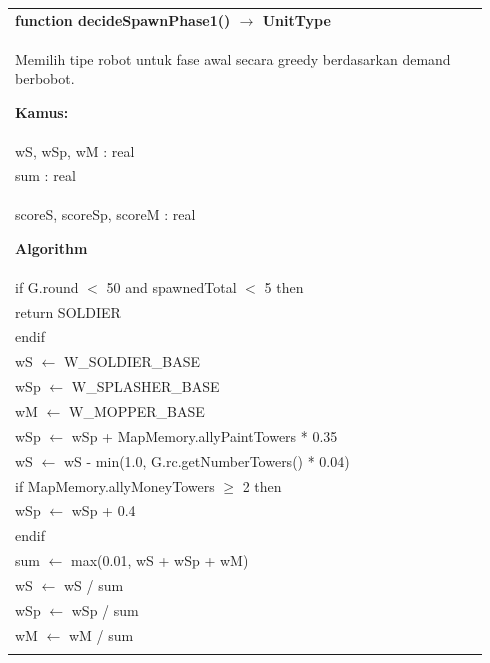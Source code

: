 \documentclass{article}
\newenvironment{pseudobox}
{
\centering
\begin{longtable}{|p{0.94\linewidth}|}
\hline
}
{
\\ \hline
\end{longtable}
\vspace{0.05cm}
}
\begin{document}
\begin{pseudobox}
\textbf{function decideSpawnPhase1() $\rightarrow$ UnitType} \\
{ Memilih tipe robot untuk fase awal secara greedy berdasarkan demand berbobot. }

\textbf{Kamus:} \\
\hspace*{1em} wS, wSp, wM : real \\
\hspace*{1em} sum : real \\
\hspace*{1em} scoreS, scoreSp, scoreM : real

\textbf{Algorithm} \\
\hspace*{1em} if G.round $<$ 50 and spawnedTotal $<$ 5 then \\
\hspace*{2em} return SOLDIER \\
\hspace*{1em} endif \\

\hspace*{1em} wS $\leftarrow$ W\_SOLDIER\_BASE \\
\hspace*{1em} wSp $\leftarrow$ W\_SPLASHER\_BASE \\
\hspace*{1em} wM $\leftarrow$ W\_MOPPER\_BASE \\

\hspace*{1em} wSp $\leftarrow$ wSp + MapMemory.allyPaintTowers * 0.35 \\
\hspace*{1em} wS $\leftarrow$ wS - min(1.0, G.rc.getNumberTowers() * 0.04) \\

\hspace*{1em} if MapMemory.allyMoneyTowers $\geq$ 2 then \\
\hspace*{2em} wSp $\leftarrow$ wSp + 0.4 \\
\hspace*{1em} endif \\

\hspace*{1em} sum $\leftarrow$ max(0.01, wS + wSp + wM) \\
\hspace*{1em} wS $\leftarrow$ wS / sum \\
\hspace*{1em} wSp $\leftarrow$ wSp / sum \\
\hspace*{1em} wM $\leftarrow$ wM / sum \\


\end{pseudobox}
\end{document}
